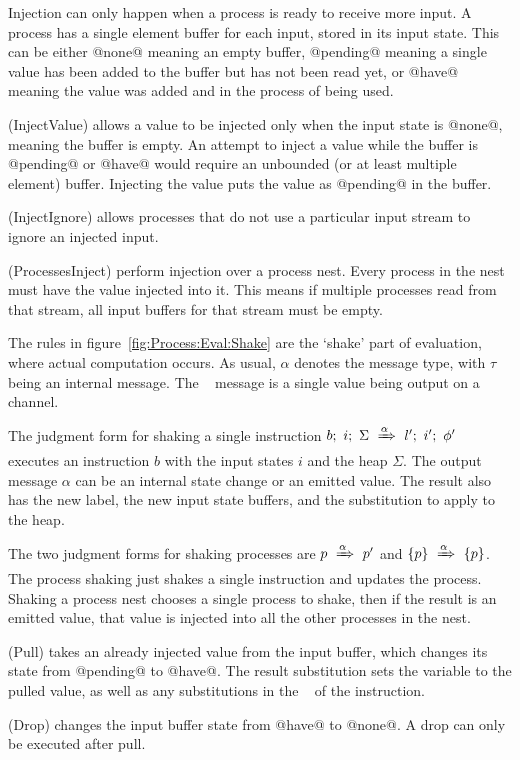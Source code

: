 Injection can only happen when a process is ready to receive more input.
A process has a single element buffer for each input, stored in its input state.
This can be either @none@ meaning an empty buffer, @pending@ meaning a single value has been added to the buffer but has not been read yet, or @have@ meaning the value was added and in the process of being used.

(InjectValue) allows a value to be injected only when the input state is @none@, meaning the buffer is empty.
An attempt to inject a value while the buffer is @pending@ or @have@ would require an unbounded (or at least multiple element) buffer.
Injecting the value puts the value as @pending@ in the buffer.

(InjectIgnore) allows processes that do not use a particular input stream to ignore an injected input.

(ProcessesInject) perform injection over a process nest.
Every process in the nest must have the value injected into it.
This means if multiple processes read from that stream, all input buffers for that stream must be empty.

The rules in figure~\ref{fig:Process:Eval:Shake} are the `shake' part of evaluation, where actual computation occurs. 
As usual, $\alpha$ denotes the message type, with $\tau$ being an internal message. The \Push~ message is a single value being output on a channel.


The judgment form for shaking a single instruction $b;~i;~\Sigma~\xRightarrow{\alpha}~l';~i';~\phi'$
executes an instruction $b$ with the input states $i$ and the heap $\Sigma$.
The output message $\alpha$ can be an internal state change or an emitted value.
The result also has the new label, the new input state buffers, and the substitution to apply to the heap.

The two judgment forms for shaking processes are $p~\xRightarrow{\alpha}~p'$ and $\{ p \}~\xRightarrow{\alpha}~\{ p \}$.
The process shaking just shakes a single instruction and updates the process.
Shaking a process nest chooses a single process to shake, then if the result is an emitted value, that value is injected into all the other processes in the nest.

(Pull) takes an already injected value from the input buffer, which changes its state from @pending@ to @have@.
The result substitution sets the variable to the pulled value, as well as any substitutions in the \Goto~ of the instruction.

(Drop) changes the input buffer state from @have@ to @none@. A drop can only be executed after pull.

